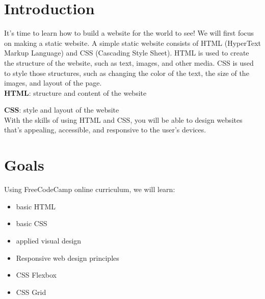 \documentclass{42-en}
\begin{document}
\chapter{Introduction}

It's time to learn how to build a website for the world to see! We will first focus on making a static website. A simple static website consists of HTML (HyperText Markup Language) and CSS (Cascading Style Sheet). HTML is used to create the structure of the website, such as text, images, and other media. CSS is used to style those structures, such as changing the color of the text, the size of the images, and layout of the page.\\
    
\textbf{HTML}: structure and content of the website\par
\textbf{CSS}: style and layout of the website\\

With the skills of using HTML and CSS, you will be able to design websites that's appealing, accessible, and responsive to the user's devices.



\chapter{Goals}

Using FreeCodeCamp online curriculum, we will learn:
\begin{itemize}
    \item basic HTML
    \item basic CSS
    \item applied visual design
    \item Responsive web design principles
    \item CSS Flexbox
    \item CSS Grid
\end{itemize}
\end{document}
